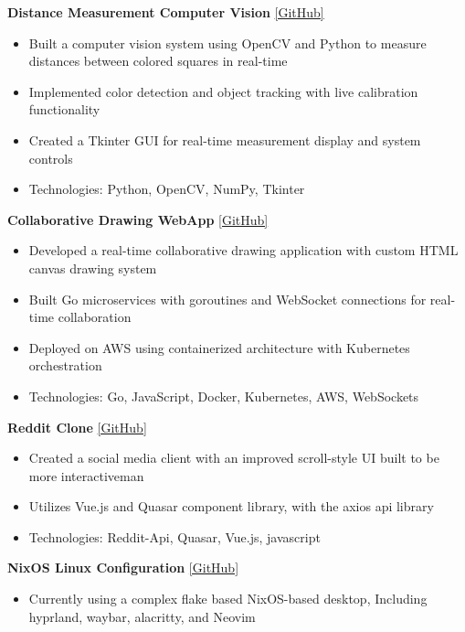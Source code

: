\documentclass[10pt,a4paper]{article}
\begin{document}
	\textbf{Distance Measurement Computer Vision} \href{https://github.com/CameronBadman/computer-vision}{[GitHub]}
	\begin{itemize}[label=\textbullet, itemsep=0.05cm]
		\item Built a computer vision system using OpenCV and Python to measure distances between colored squares in real-time
		\item Implemented color detection and object tracking with live calibration functionality
		\item Created a Tkinter GUI for real-time measurement display and system controls
		\item Technologies: Python, OpenCV, NumPy, Tkinter
	\end{itemize}
	
	\textbf{Collaborative Drawing WebApp} \href{https://github.com/CameronBadman/Canvis-collab-webapp}{[GitHub]}
	\begin{itemize}[label=\textbullet, itemsep=0.05cm]
		\item Developed a real-time collaborative drawing application with custom HTML canvas drawing system
		\item Built Go microservices with goroutines and WebSocket connections for real-time collaboration
		\item Deployed on AWS using containerized architecture with Kubernetes orchestration
		\item Technologies: Go, JavaScript, Docker, Kubernetes, AWS, WebSockets
	\end{itemize}
	
	\textbf{Reddit Clone} \href{https://github.com/CameronBadman/Reddit-Clone}{[GitHub]}
	\begin{itemize}[label=\textbullet, itemsep=0.05cm]
		\item Created a social media client with an improved scroll-style UI built to be more interactiveman 
		\item Utilizes Vue.js and Quasar component library, with the axios api library
		\item Technologies: Reddit-Api, Quasar, Vue.js, javascript
	\end{itemize}
	
	\textbf{NixOS Linux Configuration} \href{https://github.com/CameronBadman/nvim-config}{[GitHub]}
	\begin{itemize}[label=\textbullet, itemsep=0.05cm]
		\item Currently using a complex flake based NixOS-based desktop, Including hyprland, waybar, alacritty, and Neovim
	\end{itemize}
	
\end{document}
